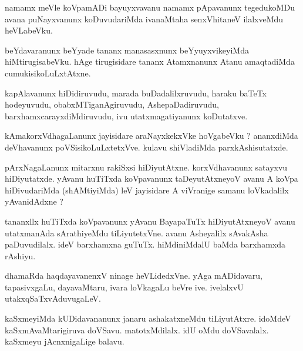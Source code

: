 \documentclass{article}
\begin{document}
\begin{mn}
namamx  meVle  koVpamADi  bayuyxvavanu  namamx  pApavanunx  tegedukoMDu  avana  
puNayxvanunx  koDuvudariMda  ivanaMtaha  senxVhitaneV  ilalxveMdu  heVLabeVku.
\end{mn}

\begin{mn}
beYdavaranunx  beYyade  tananx  manasasxnunx  beYyuyxvikeyiMda  hiMtirugisabeVku.  hAge  
tirugisidare  tananx  Atamxnanunx  Atanu  amaqtadiMda  cumukisikoLuLxtAtxne.
\end{mn}

\begin{mn}
kapAlavanunx  hiDidiruvudu,  marada  buDadalilxruvudu,  haraku  baTeTx hodeyuvudu,  obabxMTiganAgiruvudu,  
AshepaDadiruvudu,  barxhamxcarayxdiMdiruvudu,  ivu  utatxmagatiyanunx  koDutatxve. 
\end{mn}

\begin{mn}
kAmakorxVdhagaLanunx  jayisidare  araNayxkekxVke  hoVgabeVku ?  ananxdiMda  
deVhavanunx  poVSisikoLuLxtetxVve.  kulavu  shiVladiMda  parxkAshisutatxde.
\end{mn}

\begin{mn}
pArxNagaLanunx  mitarxnu  rakiSxsi  hiDiyutAtxne.  korxVdhavanunx  satayxvu  hiDiyutatxde.  
yAvanu  huTiTxda  koVpavanunx  taDeyutAtxneyoV  avanu  A  koVpa  hiDivudariMda (shAMtiyiMda) 
leV  jayisidare  A  viVranige  samanu  loVkadalilx  yAvanidAdxne ?
\end{mn}

\begin{mn}
tananxllx  huTiTxda  koVpavanunx  yAvanu  BayapaTuTx  hiDiyutAtxneyoV  avanu  
utatxmanAda  sArathiyeMdu  tiLiyutetxVne.  avanu  Asheyalilx  sAvakAsha 
paDuvudilalx.  ideV  barxhamxna  guTuTx.  hiMdiniMdalU  baMda  barxhamxda  rAshiyu.
\end{mn}

\begin{mn}
dhamaRda  haqdayavanenxV  ninage  heVLidedxVne.  yAga mADidavaru,  tapasivxgaLu,  
dayavaMtaru,  ivara  loVkagaLu  beVre  ive.  ivelalxvU  utakxqSaTxvAduvugaLeV.
\end{mn}

\begin{mn}
kaSxmeyiMda  kUDidavananunx  janaru  ashakatxneMdu  tiLiyutAtxre.  idoMdeV  kaSxmAvaMtarigiruva  
doVSavu.  matotxMdilalx.  idU  oMdu  doVSavalalx.  kaSxmeyu  jAcnxnigaLige  balavu.
\end{mn}
\end{document}
